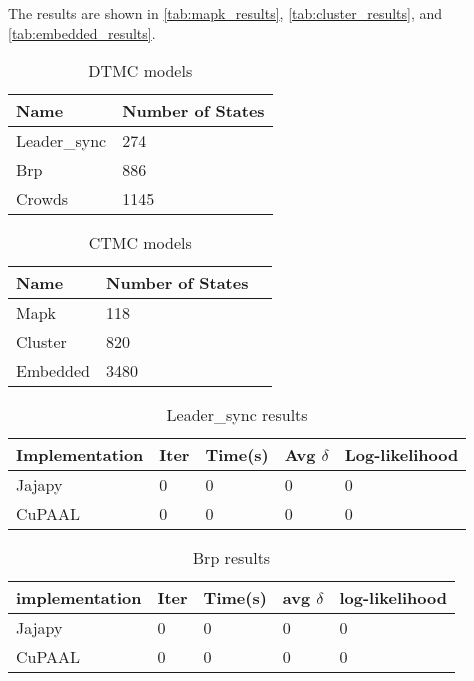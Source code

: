 The results are shown in \autoref{tab:mapk_results}, \autoref{tab:cluster_results}, and \autoref{tab:embedded_results}.

\begin{table}[!htb]
    \centering
    \caption{DTMC models}
    \label{tab:dtmc_models}
    \begin{tabular}{ll}
        \toprule
        Name         & Number of States \\
        \midrule
        Leader\_sync & 274              \\
        Brp          & 886              \\
        Crowds       & 1145             \\
        \bottomrule
    \end{tabular}
\end{table}

\begin{table}[!htb]
    \centering
    \caption{CTMC models}
    \label{tab:ctmc_models}
    \begin{tabular}{lll}
        \toprule
        Name     & Number of States \\
        \midrule
        Mapk     & 118              \\
        Cluster  & 820              \\
        Embedded & 3480             \\
        \bottomrule
    \end{tabular}
\end{table}


\begin{table}[!htb]
    \centering
    \caption{Leader\_sync results}
    \label{tab:leader_results}
    \begin{tabular}{lllll}
        \toprule
        Implementation & Iter & Time(s) & Avg $\delta$ & Log-likelihood \\
        \midrule
        Jajapy         & 0    & 0       & 0            & 0              \\
        CuPAAL         & 0    & 0       & 0            & 0              \\
        \bottomrule
    \end{tabular}
\end{table}

\begin{table}[!htb]
    \centering
    \caption{Brp results}
    \label{tab:brp_results}
    \begin{tabular}{lllll}
        \toprule
        implementation & Iter & Time(s) & avg $\delta$ & log-likelihood \\
        \midrule
        Jajapy         & 0    & 0       & 0            & 0              \\
        CuPAAL         & 0    & 0       & 0            & 0              \\
        \bottomrule
    \end{tabular}
\end{table}

